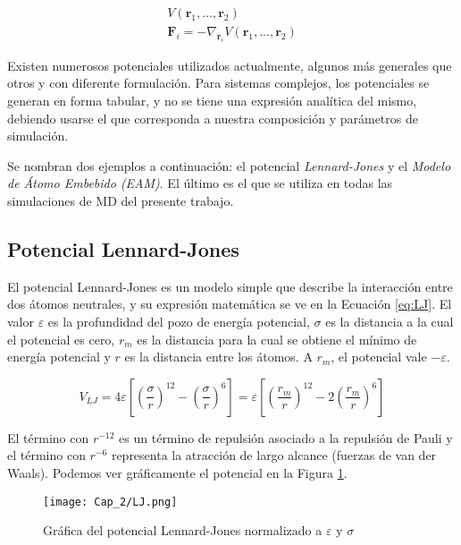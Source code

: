 \begin{eqnarray}
V(\mathbf{r}_{1},...,\mathbf{r}_{2})
\label{eq:pot}\\
\mathbf{F}_{i} = -\nabla_{\mathbf{r}_{i}}V(\mathbf{r}_{1},...,\mathbf{r}_{2})
\label{eq:potfza}
\end{eqnarray}

Existen numerosos potenciales utilizados actualmente, algunos más generales que otros y con diferente formulación. Para sistemas complejos, los potenciales se generan en forma tabular, y no se tiene una expresión analítica del mismo, debiendo usarse el que corresponda a nuestra composición y parámetros de simulación.

Se nombran dos ejemplos a continuación: el potencial \textit{Lennard-Jones} y el \textit{Modelo de Átomo Embebido (EAM)}. El último es el que se utiliza en todas las simulaciones de MD del presente trabajo.

\subsection{Potencial Lennard-Jones}
\label{SS2_3_1}

El potencial Lennard-Jones es un modelo simple que describe la interacción entre dos 	átomos neutrales, y su expresión matemática se ve en la Ecuación \ref{eq:LJ}. El valor $\varepsilon$ es la profundidad del pozo de energía potencial, $\sigma$ es la distancia a la cual el potencial es cero, $r_{m}$ es la distancia para la cual se obtiene el mínimo de energía potencial y $r$ es la distancia entre los átomos. A $r_{m}$, el potencial vale $-\varepsilon$.

\begin{equation}
V_{LJ}=
4\varepsilon \left[ \left( \frac{\sigma}{r} \right)^{12} - \left( \frac{\sigma}{r} \right)^{6} \right] = 
\varepsilon \left[ \left( \frac{r_{m}}{r} \right)^{12} -2 \left( \frac{r_{m}}{r} \right)^{6} \right]
\label{eq:LJ}
\end{equation}

El término con $r^{-12}$ es un término de repulsión asociado a la repulsión de Pauli\footnotemark{} y el término con $r^{-6}$ representa la atracción de largo alcance (fuerzas de van der Waals\footnotemark). Podemos ver gráficamente el potencial en la Figura \ref{C2:fg:LJ}.

\begin{figure}[htp]
\centering
\texttt{[image: Cap\_2/LJ.png]}
\caption[Potencial de Lennard-Jones]{Gráfica del potencial Lennard-Jones normalizado a $\varepsilon$ y $\sigma$}
\label{C2:fg:LJ}
\end{figure}

